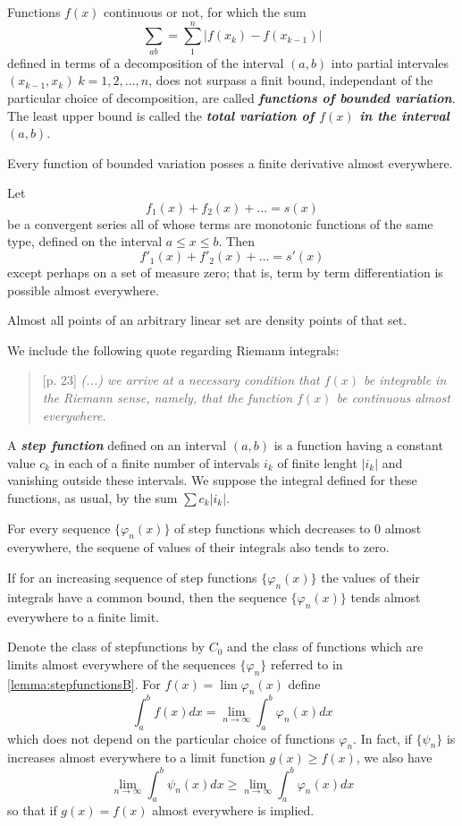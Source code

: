 \documentclass{article}
\theoremstyle{definition}
\numberwithin{equation}{section}
\begin{document}
	Functions $f(x)$ continuous or not, for which the sum
	\[\sum_{ab}=\sum_1^n|f(x_k)-f(x_{k-1})|\]
	defined in terms of a decomposition of the interval $(a,b)$ into partial intervales $(x_{k-1},x_k)\;k=1,2,\ldots,n$, does not surpass a finit bound, independant of the particular choice of decomposition, are called \textbf{\textit{functions of bounded variation}}. The least upper bound is called the \textbf{\textit{total variation of $f(x)$ in the interval $(a,b)$}}.
	\begin{thm}[Lebesgue]
		Every function of bounded variation posses a finite derivative almost everywhere.
	\end{thm}
	\begin{thm}[Fubini]
		Let
		\[f_1(x)+f_2(x)+\ldots=s(x)\]
		be a convergent series all of whose terms are monotonic functions of the same type, defined on the interval $a\leq x\leq b$. Then
		\[f'_1(x)+f'_2(x)+\ldots=s'(x)\]
		except perhaps on a set of measure zero; that is, term by term differentiation is possible almost everywhere.
	\end{thm}
	\begin{thm}[Lebesgue]
		Almost all points of an arbitrary linear set are density points of that set.
	\end{thm}
	We include the following quote regarding Riemann integrals:
	\begin{quotation}[p. 23]
		\textit{(...) we arrive at a necessary condition that $f(x)$ be integrable in the Riemann sense, namely, that the function $f(x)$ be continuous almost everywhere.}
	\end{quotation}
	A \textbf{\textit{step function}} defined on an interval $(a,b)$ is a function having a constant value $c_k$ in each of a finite number of intervals $i_k$ of finite lenght $|i_k|$ and vanishing outside these intervals. We suppose the integral defined for these functions, as usual, by the sum $\sum c_k|i_k|$.
	\begin{lemma}\label{lemma:stepfunctionsA}
		For every sequence $\{\varphi_n(x)\}$ of step functions which decreases to 0 almost everywhere, the sequene of values of their integrals also tends to zero.
	\end{lemma}
	\begin{lemma}\label{lemma:stepfunctionsB}
		If for an increasing sequence of step functions $\{\varphi_n(x)\}$ the values of their integrals have a common bound, then the sequence $\{\varphi_n(x)\}$ tends almost everywhere to a finite limit.
	\end{lemma}
	Denote the class of stepfunctions by $C_0$ and the class of functions which are limits almost everywhere of the sequences $\{\varphi_n\}$ referred to in \cref{lemma:stepfunctionsB}. For $f(x)=\lim\varphi_n(x)$ define
	\[\int_a^bf(x)dx=\lim_{n\to \infty}\int_a^b\varphi_n(x)dx\]
	which does not depend on the particular choice of functions $\varphi_n$. In fact, if $\{\psi_n\}$ is increases almost everywhere to a limit function $g(x)\geq f(x)$, we also have
	\[\lim_{n\to\infty}\int_a^b\psi_n(x)dx\geq\lim_{n\to\infty}\int_a^b\varphi_n(x)dx\]
	so that if $g(x)=f(x)$ almost everywhere is implied.
\end{document}
